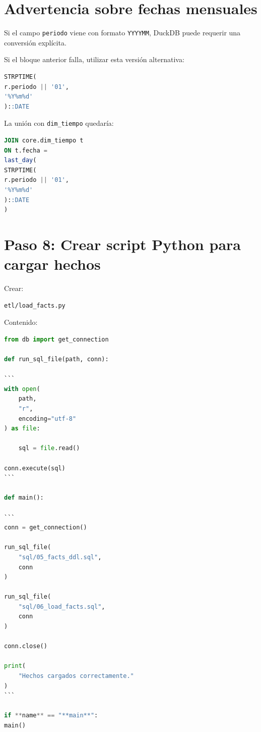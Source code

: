 \section{Advertencia sobre fechas mensuales}

Si el campo \texttt{periodo} viene con formato \texttt{YYYYMM}, DuckDB puede requerir una conversión explícita.

Si el bloque anterior falla, utilizar esta versión alternativa:

\begin{lstlisting}[language=SQL]
STRPTIME(
r.periodo || '01',
'%Y%m%d'
)::DATE
\end{lstlisting}

La unión con \texttt{dim_tiempo} quedaría:

\begin{lstlisting}[language=SQL]
JOIN core.dim_tiempo t
ON t.fecha =
last_day(
STRPTIME(
r.periodo || '01',
'%Y%m%d'
)::DATE
)
\end{lstlisting}

\section{Paso 8: Crear script Python para cargar hechos}

Crear:

\begin{verbatim}
etl/load_facts.py
\end{verbatim}

Contenido:

\begin{lstlisting}[language=Python]
from db import get_connection

def run_sql_file(path, conn):

```
with open(
    path,
    "r",
    encoding="utf-8"
) as file:

    sql = file.read()

conn.execute(sql)
```

def main():

```
conn = get_connection()

run_sql_file(
    "sql/05_facts_ddl.sql",
    conn
)

run_sql_file(
    "sql/06_load_facts.sql",
    conn
)

conn.close()

print(
    "Hechos cargados correctamente."
)
```

if **name** == "**main**":
main()
\end{lstlisting}


